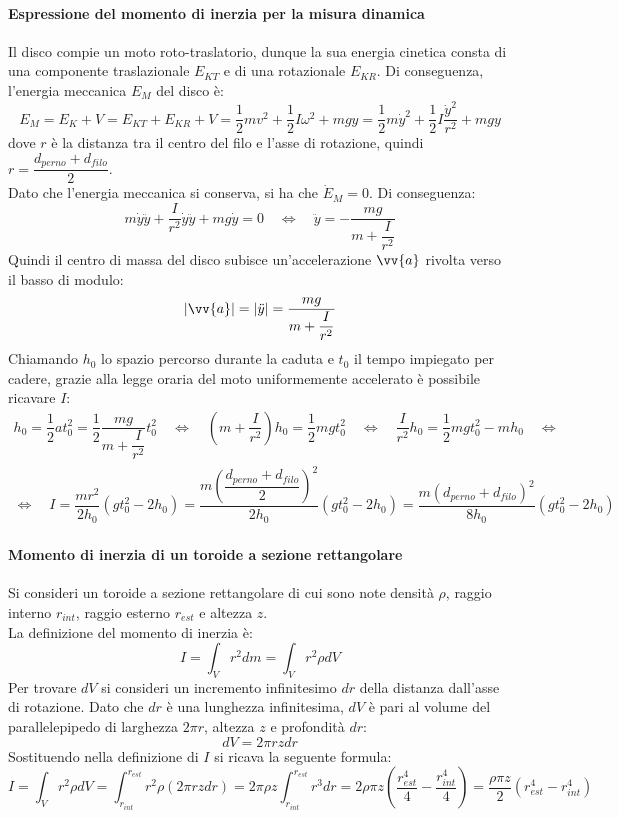 \documentclass{article}
\begin{document}
\paragraph{Espressione del momento di inerzia per la misura dinamica}
Il disco compie un moto roto-traslatorio, dunque la sua energia cinetica consta di una componente traslazionale $ E_{KT} $ e di una rotazionale $ E_{KR} $. Di conseguenza, l'energia meccanica $ E_M $ del disco è:
$$ E_M = E_K + V = E_{KT} + E_{KR} + V = \dfrac{1}{2} m v^2 + \dfrac{1}{2} I \omega ^2 + m g y = \dfrac{1}{2} m \dot{y}^2 + \dfrac{1}{2} I \dfrac{\dot{y}^2}{r^2} + m g y $$
dove $ r $ è la distanza tra il centro del filo e l'asse di rotazione, quindi $ r = \dfrac{d_{perno} + d_{filo}}{2} $.\\
Dato che l'energia meccanica si conserva, si ha che $ \dot{E}_M = 0 $. Di conseguenza:
$$ m \dot{y} \ddot{y} + \dfrac{I}{r^2} \dot{y} \ddot{y} + m g \dot{y} = 0 \quad \Longleftrightarrow \quad \ddot{y} = - \dfrac{m g}{m + \dfrac{I}{r^2}} $$
Quindi il centro di massa del disco subisce un'accelerazione $ \vv{a} $ rivolta verso il basso di modulo:
$$ \abs{\vv{a}} = \abs{\ddot{y}} = \dfrac{m g}{m + \dfrac{I}{r^2}} $$
Chiamando $ h_0 $ lo spazio percorso durante la caduta e $ t_0 $ il tempo impiegato per cadere, grazie alla legge oraria del moto uniformemente accelerato è possibile ricavare $ I $:
\begin{gather*}
h_0 = \dfrac{1}{2} a t_0^2 = \dfrac{1}{2} \dfrac{m g}{m + \dfrac{I}{r^2}} t_0^2 \quad \Longleftrightarrow \quad \left( m + \dfrac{I}{r^2} \right) h_0 = \dfrac{1}{2} m g t_0^2 \quad \Longleftrightarrow \quad \dfrac{I}{r^2} h_0 = \dfrac{1}{2} m g t_0^2 - m h_0 \quad \Longleftrightarrow \\
\Longleftrightarrow \quad I = \dfrac{m r^2}{2 h_0} ( g t_0^2 - 2 h_0 ) = \dfrac{m \left( \dfrac{d_{perno} + d_{filo}}{2} \right) ^2}{2 h_0} ( g t_0^2 - 2 h_0 ) = \dfrac{m ( d_{perno} + d_{filo} )^2}{8 h_0} ( g t_0^2 - 2 h_0 )
\end{gather*}

\paragraph{Momento di inerzia di un toroide a sezione rettangolare}
Si consideri un toroide a sezione rettangolare di cui sono note densità $ \rho $, raggio interno $ r_{int} $, raggio esterno $ r_{est} $ e altezza $ z $.\\
La definizione del momento di inerzia è:
$$ I = \int_V r ^ 2 dm = \int_V r ^ 2 \rho dV $$
Per trovare $ dV $ si consideri un incremento infinitesimo $ dr $ della distanza dall'asse di rotazione. Dato che $ dr $ è una lunghezza infinitesima, $ dV $ è pari al volume del parallelepipedo di larghezza $ 2 \pi r $, altezza $ z $ e profondità $ dr $:
$$ dV = 2 \pi r z dr $$
Sostituendo nella definizione di $ I $ si ricava la seguente formula:
$$ I = \int_V r ^ 2 \rho dV = \int_{r_{int}}^{r_{est}} r ^ 2 \rho \left( 2 \pi r z dr \right) = 2 \pi \rho z \int_{r_{int}}^{r_{est}} r ^ 3 dr = 2 \rho \pi z \left( \dfrac{r_{est} ^ 4}{4} - \dfrac{r_{int} ^ 4}{4} \right) = \dfrac{\rho \pi z}{2} \left( r_{est} ^ 4 - r_{int} ^ 4 \right) $$
\end{document}
